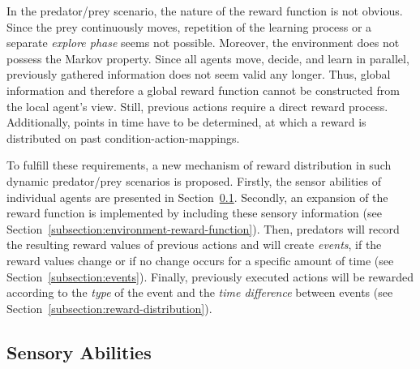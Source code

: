 \documentclass{sig-alternate}
\begin{document}
In the predator/prey scenario, the nature of the reward function is not obvious. Since the prey continuously moves, %
repetition of the learning process or a separate \emph{explore phase} seems not possible. Moreover, the environment does not possess the Markov property. Since all agents move, decide, and learn in parallel, previously gathered information does not seem valid any longer. %
Thus, global information and therefore a global reward function cannot be constructed from the local agent's view. Still, previous actions require a direct reward process. Additionally, points in time have to be determined, at which a reward is distributed on past condition-action-mappings.

To fulfill these requirements, a new mechanism of reward distribution in such dynamic predator/prey scenarios is proposed. Firstly, the sensor abilities of individual agents are presented in Section~\ref{subsection:sensory-abilities}. Secondly, an expansion of the reward function is implemented by 
including these sensory information (see Section~\ref{subsection:environment-reward-function}). Then, predators will record the resulting reward values of previous actions and will create \emph{events}, if the reward values change or if no change occurs for a specific amount of time (see Section~\ref{subsection:events}). Finally, previously executed actions will be rewarded according to the \emph{type} of the event and the \emph{time difference} between events
(see Section~\ref{subsection:reward-distribution}). %

\subsection{Sensory Abilities}
\label{subsection:sensory-abilities}
\end{document}
